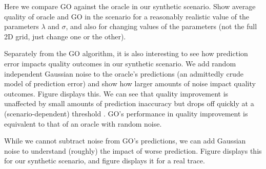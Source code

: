 \fillme



Here we compare GO against the oracle in our synthetic scenario.  Show average quality of oracle and GO in the scenario for a reasonably realistic value of the parameters $\lambda$ and $\sigma$, and also for changing values of the parameters (not the full 2D grid, just change one or the other). \fillme


Separately from the GO algorithm, it is also interesting to see how prediction error impacts quality outcomes in our synthetic scenario.  We add random independent Gaussian noise to the oracle’s predictions (an admittedly crude model of prediction error) and show how larger amounts of noise impact quality outcomes.  Figure \fillme displays this.  We can see that quality improvement is unaffected by small amounts of prediction inaccuracy but drops off quickly at a (scenario-dependent) threshold \fillme.  GO’s performance in quality improvement is equivalent to that of an oracle with \fillme random noise.

While we cannot subtract noise from GO's predictions, we can add Gaussian noise to understand (roughly) the impact of worse prediction.  Figure \fillme displays this for our synthetic scenario, and figure \fillme displays it for a real trace.